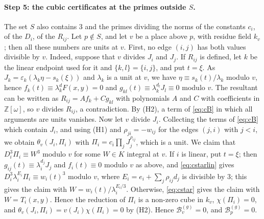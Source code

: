 \documentclass[11pt]{article}
\newcommand{\Z}{\mathbb{Z}}
\begin{document}
\paragraph{Step 5: the cubic certificates at the primes outside $S$.} The set $S$ also contains $3$ and the primes dividing the norms of the constants $c_i$, of the $D_i$, of the $R_{ij}$. Let $p\notin S$, and let $v$ be a place above $p$, with residue field $k_v$; then all these numbers are units at $v$. First, no edge $(i,j)$ has both values divisible by $v$. Indeed, suppose that $v$ divides $J_i$ and $J_j$. If $R_{ij}$ is defined, let $k$ be the linear endpoint used for it and $\{k,l\}=\{i,j\}$, and put $t=\xi$. As $J_k=\varepsilon_k(\lambda_k\eta-s_k(\xi))$ and $\lambda_k$ is a unit at $v$, we have $\eta\equiv s_k(t)/\lambda_k$ modulo $v$, hence $f_k(t)\equiv\lambda_k^dF(x,y)=0$ and $g_{kl}(t)\equiv\lambda_k^{d_l}J_l\equiv0$ modulo $v$. The resultant can be written as $R_{ij}=Af_k+Cg_{kl}$ with polynomials $A$ and $C$ with coefficients in $\Z[\omega]$, so $v$ divides $R_{ij}$, a contradiction. By (H2), a term of \eqref{eq:cB} in which all arguments are units vanishes. Now let $v$ divide $J_i$. Collecting the terms of \eqref{eq:cB} which contain $J_i$, and using (H1) and $\rho_{ji}=-w_{ij}$ for the edges $(j,i)$ with $j<i$, we obtain $\theta_v(J_i,\Pi_i)$ with $\Pi_i=c_i\prod_jJ_j^{\rho_{ij}}$, which is a unit. We claim that $D_i^3\Pi_i\equiv W^3$ modulo $v$ for some $W\in K$ integral at $v$. If $i$ is linear, put $t=\xi$; then $g_{ij}(t)\equiv\lambda_i^{d_j}J_j$ and $f_i(t)\equiv0$ modulo $v$ as above, and \eqref{eq:cstarlin} gives $D_i^3\lambda_i^{E_i}\Pi_i\equiv w_i(t)^3$ modulo $v$, where $E_i=e_i+\sum_j\rho_{ij}d_j$ is divisible by $3$; this gives the claim with $W=w_i(t)/\lambda_i^{E_i/3}$. Otherwise, \eqref{eq:cstar} gives the claim with $W=T_i(x,y)$. Hence the reduction of $\Pi_i$ is a non-zero cube in $k_v$, $\chi(\Pi_i)=0$, and $\theta_v(J_i,\Pi_i)=v(J_i)\chi(\Pi_i)=0$ by (H2). Hence $\mathcal B^{(g)}_v=0$, and $\mathcal B^{(g)}_p=0$.
\end{document}
